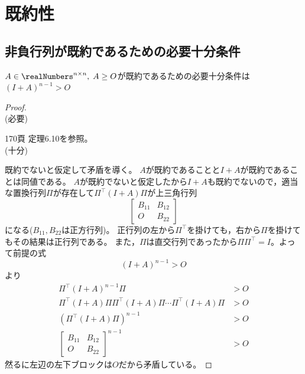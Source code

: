 \chapter{既約性}
    \section{非負行列が既約であるための必要十分条件}
        \begin{shadebox}
            $A\in\realNumbers^{n\times n},\;A\geq O$が既約であるための必要十分条件は$\left(I+A\right)^{n-1}>O$
        \end{shadebox}
        \begin{proof}
            \quad\\
            (必要)
            \par
            \cite{システム線形代数} 170頁 定理6.10を参照。\\
            (十分)
            \par
            既約でないと仮定して矛盾を導く。
            $A$が既約であることと$I+A$が既約であることは同値である。
            $A$が既約でないと仮定したから$I+A$も既約でないので，適当な置換行列$\Pi$が存在して$\Pi^\top (I+A)\Pi$が上三角行列
            \[
                \begin{bmatrix}
                    B_{11} & B_{12}\\
                    O & B_{22}
                \end{bmatrix}
            \]
            になる($B_{11},B_{22}$は正方行列)。
            正行列の左から$\Pi^\top$を掛けても，右から$\Pi$を掛けてもその結果は正行列である。
            また，$\Pi$は直交行列であったから$\Pi\Pi^\top=I$。よって前提の式
            \[\left(I+A\right)^{n-1}>O\]
            より
            \begin{align*}
                \Pi^\top(I+A)^{n-1}\Pi &> O\\
                \Pi^\top(I+A)\Pi\Pi^\top(I+A)\Pi\dotsm\Pi^\top(I+A)\Pi &> O\\
                \left(\Pi^\top(I+A)\Pi\right)^{n-1}&> O\\
                \begin{bmatrix}
                    B_{11} & B_{12}\\
                    O & B_{22}
                \end{bmatrix}^{n-1} &> O
            \end{align*}
            然るに左辺の左下ブロックは$O$だから矛盾している。
        \end{proof}